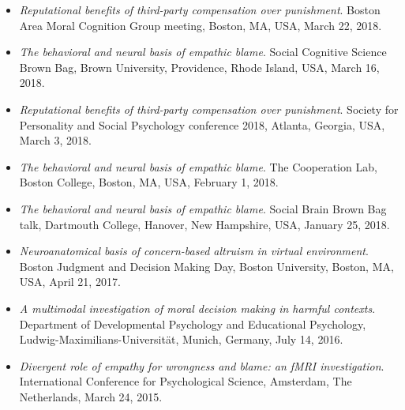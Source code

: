 \documentclass[10pt]{article}
\begin{document}
\begin{itemize}
		
	\item \textit{Reputational benefits of third-party compensation over punishment}. Boston Area Moral Cognition Group meeting, Boston, MA, USA, March 22, 2018.
	

	\item \textit{The behavioral and neural basis of empathic blame}. Social Cognitive Science Brown Bag, Brown University, Providence, Rhode Island, USA, March 16, 2018.
		
	
	\item \textit{Reputational benefits of third-party compensation over punishment}. Society for Personality and Social Psychology conference 2018, Atlanta, Georgia, USA, March 3, 2018.
	
	
	\item \textit{The behavioral and neural basis of empathic blame}. The Cooperation Lab, Boston College, Boston, MA, USA, February 1, 2018.
	
	
	\item \textit{The behavioral and neural basis of empathic blame}. Social Brain Brown Bag talk, Dartmouth College, Hanover, New Hampshire, USA, January 25, 2018.
	
	
	\item \textit{Neuroanatomical basis of concern-based altruism in virtual environment}. Boston Judgment and Decision Making Day, Boston University, Boston, MA, USA, April 21, 2017.
	
	
%	

	\item \textit{A multimodal investigation of moral decision making in harmful contexts}. Department of Developmental Psychology and Educational Psychology, Ludwig-Maximilians-Universit{\"a}t, Munich, Germany, July 14, 2016.
	
		
	\item \textit{Divergent role of empathy for wrongness and blame: an fMRI investigation}. International Conference for Psychological Science, Amsterdam, The Netherlands, March 24, 2015.

    \end{itemize}
    
\end{document}
